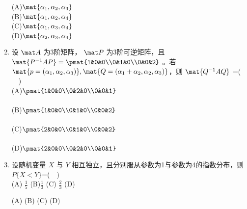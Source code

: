 \begin{enumerate}
(A)$\mat{ \alpha_1,\alpha_2,\alpha_3}$\\
(B)$\mat{ \alpha_1,\alpha_2,\alpha_4}$\\
(C)$\mat{ \alpha_1,\alpha_3,\alpha_4}$\\
(D)$\mat{ \alpha_2,\alpha_3,\alpha_4}$
\item 设 $\mat A$  为3阶矩阵， $\mat P$ 为3阶可逆矩阵，且 $\mat{P^{-1}AP}=\pmat{1&0&0\\0&1&0\\0&0&2}$  。若 $\mat{p=(\alpha_1,\alpha_2,\alpha_3)},\mat{Q=(\alpha_1+\alpha_2,\alpha_2,\alpha_3)}$，则 $\mat {Q^{-1}AQ}$ =($\quad$)\\
(A)$\pmat{1&0&0\\0&2&0\\0&0&1}$\\ \\
(B)$\pmat{1&0&0\\0&1&0\\0&0&2}$\\ \\
(C)$\pmat{2&0&0\\0&1&0\\0&0&2}$\\ \\
(D)$\pmat{2&0&0\\0&2&0\\0&0&1}$\\
\item 设随机变量 $X$ 与 $Y$ 相互独立，且分别服从参数为1与参数为4的指数分布，则  $P\{X<Y\}$=($\quad$)\\
(A)  $\frac{1}{5}$
(B)$ \frac{1}{3}$
(C) $ \frac{2}{3}$
(D)  

(A)
(B)
(C)
(D)
\end{enumerate}
